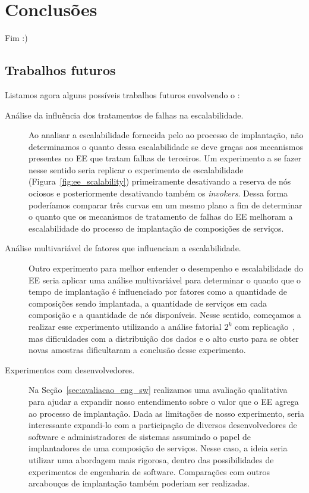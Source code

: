 \chapter{Conclusões}
\label{cap:conclusoes}

Fim :)

\section{Trabalhos futuros}

Listamos agora alguns possíveis trabalhos futuros envolvendo o \ee:

\begin{description}

\item[Análise da influência dos tratamentos de falhas na escalabilidade.] 
Ao analisar a escalabilidade fornecida pelo \ee ao processo de implantação,
não determinamos o quanto dessa escalabilidade se deve graças aos mecanismos 
presentes no EE que tratam falhas de terceiros.
Um experimento a se fazer nesse sentido seria replicar o experimento 
de escalabilidade (Figura~\ref{fig:ee_scalability})
primeiramente desativando a reserva de nós ociosos e posteriormente
desativando também os \emph{invokers}.
Dessa forma poderíamos comparar três curvas em um mesmo plano
a fim de determinar o quanto que os mecanismos de tratamento de falhas
do EE melhoram a escalabilidade do processo de implantação de composições de serviços.

\item[Análise multivariável de fatores que influenciam a escalabilidade.] 
Outro experimento para melhor entender o desempenho e escalabilidade do EE
seria aplicar uma análise multivariável para determinar o quanto
que o tempo de implantação é influenciado por fatores como a quantidade de composições
sendo implantada, a quantidade de serviços em cada composição e a quantidade
de nós disponíveis.
Nesse sentido, começamos a realizar esse experimento utilizando a análise fatorial $2^k$
com replicação~\cite{Jain20002kr}, mas dificuldades com a distribuição dos dados e o alto custo
para se obter novas amostras dificultaram a conclusão desse experimento.

\item[Experimentos com desenvolvedores.] 
Na Seção~\ref{sec:avaliacao_eng_sw} realizamos uma avaliação qualitativa para
ajudar a expandir nosso entendimento sobre o valor que o EE agrega ao processo de implantação.
Dada as limitações de nosso experimento, seria interessante expandi-lo
com a participação de diversos desenvolvedores de software
e administradores de sistemas assumindo o papel de implantadores de uma composição de serviços.
Nesse caso, a ideia seria utilizar uma abordagem mais rigorosa,
dentro das possibilidades de experimentos de engenharia de software.
Comparações com outros arcabouços de implantação também poderiam ser realizadas.


\end{description}

